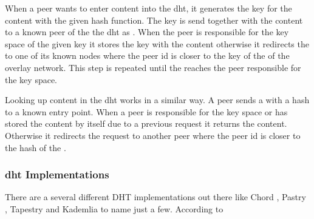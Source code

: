 When a peer wants to enter content into the \gls{dht}, it generates the key for the content with the given hash function. The key is send together with the content to a known peer of the the \gls{dht} as . When the peer is responsible for the key space of the given key it stores the key with the content otherwise it redirects the  to one of its known nodes where the peer id is closer to the key of the  of the overlay network. This step is repeated until the  reaches the peer responsible for the key space.

Looking up content in the \gls{dht} works in a similar way. A peer sends a  with a hash to a known entry point. When a peer is responsible for the key space or has stored the content by itself due to a previous request it returns the content. Otherwise it redirects the request to another peer where the peer id is closer to the hash of the .

\subsubsection{\gls{dht} Implementations}
There are a several different DHT implementations out there like Chord \cite{chord}, Pastry \cite{pastry}, Tapestry \cite{tapestry} and Kademlia \cite{kademlia} to name just a few.
According to \citet[]{tanenbaum_wetherall_2011} 

